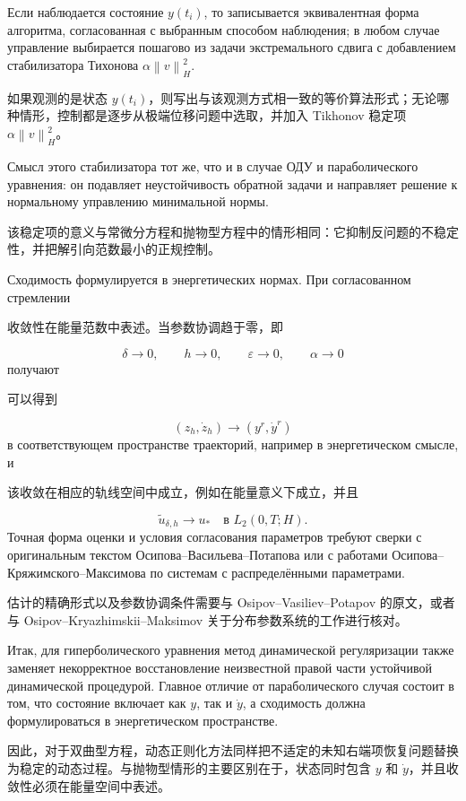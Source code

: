 \documentclass[12pt,a4paper]{article}
\newcommand{\norm}[1]{\left\lVert #1\right\rVert}
\newcommand{\zh}[1]{\par\noindent #1\par}
\begin{document}
Если наблюдается состояние $y(t_i)$, то записывается эквивалентная форма алгоритма, согласованная с выбранным способом наблюдения; в любом случае управление выбирается пошагово из задачи экстремального сдвига с добавлением стабилизатора Тихонова $\alpha\norm{v}_H^2$.
\zh{如果观测的是状态 $y(t_i)$，则写出与该观测方式相一致的等价算法形式；无论哪种情形，控制都是逐步从极端位移问题中选取，并加入 Tikhonov 稳定项 $\alpha\norm{v}_H^2$。}

Смысл этого стабилизатора тот же, что и в случае ОДУ и параболического уравнения: он подавляет неустойчивость обратной задачи и направляет решение к нормальному управлению минимальной нормы.
\zh{该稳定项的意义与常微分方程和抛物型方程中的情形相同：它抑制反问题的不稳定性，并把解引向范数最小的正规控制。}

Сходимость формулируется в энергетических нормах. При согласованном стремлении
\zh{收敛性在能量范数中表述。当参数协调趋于零，即}
\[
    \delta\to0,
    \qquad h\to0,
    \qquad \varepsilon\to0,
    \qquad \alpha\to0
\]
получают
\zh{可以得到}
\begin{equation}
    (z_h,\dot z_h)\to (y^r,\dot y^r)
\end{equation}
в соответствующем пространстве траекторий, например в энергетическом смысле, и
\zh{该收敛在相应的轨线空间中成立，例如在能量意义下成立，并且}
\begin{equation}
    \tilde u_{\delta,h}\to u_* \quad\text{в } L_2(0,T;H).
\end{equation}
Точная форма оценки и условия согласования параметров требуют сверки с оригинальным текстом Осипова--Васильева--Потапова или с работами Осипова--Кряжимского--Максимова по системам с распределёнными параметрами.
\zh{估计的精确形式以及参数协调条件需要与 Osipov--Vasiliev--Potapov 的原文，或者与 Osipov--Kryazhimskii--Maksimov 关于分布参数系统的工作进行核对。}

Итак, для гиперболического уравнения метод динамической регуляризации также заменяет некорректное восстановление неизвестной правой части устойчивой динамической процедурой. Главное отличие от параболического случая состоит в том, что состояние включает как $y$, так и $\dot y$, а сходимость должна формулироваться в энергетическом пространстве.
\zh{因此，对于双曲型方程，动态正则化方法同样把不适定的未知右端项恢复问题替换为稳定的动态过程。与抛物型情形的主要区别在于，状态同时包含 $y$ 和 $\dot y$，并且收敛性必须在能量空间中表述。}
\end{document}
